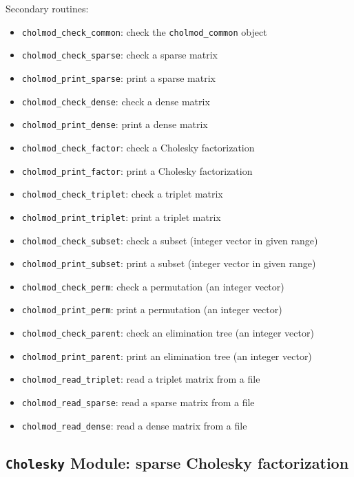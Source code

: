 \documentclass[11pt]{article}
\begin{document}
\vspace{0.1in}
\noindent Secondary routines:
    \begin{itemize}
    \item {\tt cholmod\_check\_common}: check the {\tt cholmod\_common} object
    \item {\tt cholmod\_check\_sparse}: check a sparse matrix
    \item {\tt cholmod\_print\_sparse}: print a sparse matrix
    \item {\tt cholmod\_check\_dense}: check a dense matrix
    \item {\tt cholmod\_print\_dense}: print a dense matrix
    \item {\tt cholmod\_check\_factor}: check a Cholesky factorization
    \item {\tt cholmod\_print\_factor}: print a Cholesky factorization
    \item {\tt cholmod\_check\_triplet}: check a triplet matrix
    \item {\tt cholmod\_print\_triplet}: print a triplet matrix
    \item {\tt cholmod\_check\_subset}: check a subset (integer vector in given range)
    \item {\tt cholmod\_print\_subset}: print a subset (integer vector in given range)
    \item {\tt cholmod\_check\_perm}: check a permutation (an integer vector)
    \item {\tt cholmod\_print\_perm}: print a permutation (an integer vector)
    \item {\tt cholmod\_check\_parent}: check an elimination tree (an integer vector)
    \item {\tt cholmod\_print\_parent}: print an elimination tree (an integer vector)
    \item {\tt cholmod\_read\_triplet}: read a triplet matrix from a file
    \item {\tt cholmod\_read\_sparse}: read a sparse matrix from a file
    \item {\tt cholmod\_read\_dense}: read a dense matrix from a file
    \end{itemize}

\newpage \subsection{{\tt Cholesky} Module: sparse Cholesky factorization}
\end{document}
